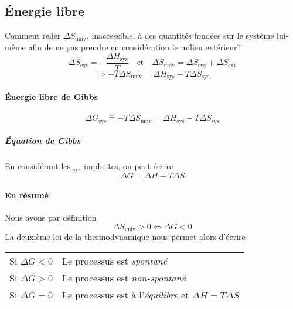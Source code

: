 
\subsection{\'Energie libre}
Comment relier $\Delta S_\mathrm{univ}$, inaccessible,
à des quantités fondées sur le système lui-même afin de ne pas prendre en considération le milieu extérieur?
\[ \Delta S_\mathrm{ext}=-\frac{\Delta H_\mathrm{sys}}{T}
  \quad\mathrm{et}\quad
\Delta S_\mathrm{univ}=\Delta S_\mathrm{sys}+\Delta S_\mathrm{ext} \]
$$\Rightarrow -T\Delta S_\mathrm{univ}=\Delta H_\mathrm{sys}-T\Delta S_\mathrm{sys}$$

\paragraph{\'Energie libre de Gibbs}
\[ \Delta G_\mathrm{sys} \eqdef -T\Delta S_\mathrm{univ} = \Delta H_\mathrm{sys} - T\Delta S_\mathrm{sys} \]

\subparagraph{\'Equation de Gibbs} En considérant les $_\mathrm{sys}$ implicites,
on peut écrire
$$\Delta G=\Delta H-T\Delta S$$

\paragraph{En résumé}
Nous avons par définition
\[ \Delta S_\mathrm{univ} > 0 \Leftrightarrow \Delta G < 0 \]
La deuxième loi de la thermodynamique nous permet alors d'écrire
\begin{center}
  \begin{tabular}{ll}
    Si $\Delta G < 0$ & Le processus est \emph{spontané}\\
    Si $\Delta G > 0$ & Le processus est \emph{non-spontané}\\
    Si $\Delta G = 0$ & Le processus est à l'\emph{équilibre} et $\Delta H=T\Delta S$
  \end{tabular}
\end{center}

